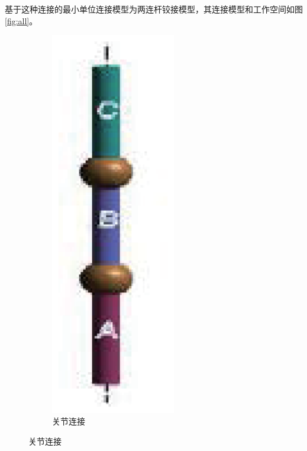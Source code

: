 基于这种连接的最小单位连接模型为两连杆铰接模型，其连接模型和工作空间如图\ref{fig:all}。
\begin{figure}[h!] %
	\begin{subfigure}{0.5\textwidth}
		\centering
		\includegraphics[width=0.6\textwidth,height=0.15\textheight]{figure/chap03/allconnect.eps}
		\caption{关节连接}
		\label{fig:allconnect}
	\end{subfigure}

\end{figure}
